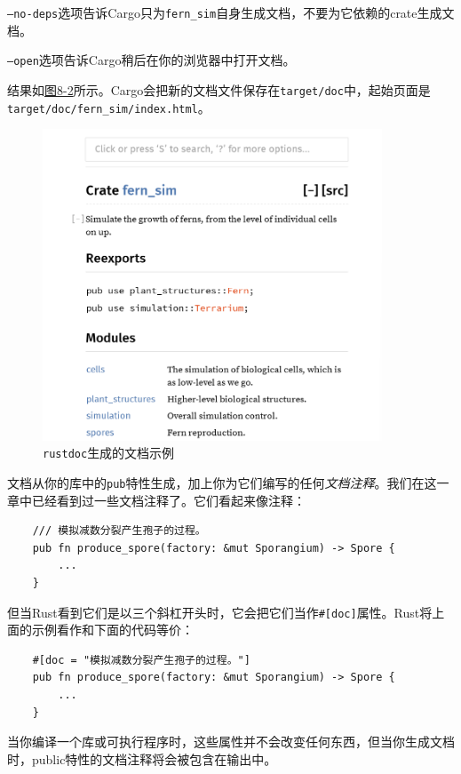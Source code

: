 \texttt{--no-deps}选项告诉Cargo只为\texttt{fern\_sim}自身生成文档，不要为它依赖的crate生成文档。

\texttt{--open}选项告诉Cargo稍后在你的浏览器中打开文档。

结果如\hyperref[f8-2]{图8-2}所示。Cargo会把新的文档文件保存在\texttt{target/doc}中，起始页面是\\
\texttt{target/doc/fern\_sim/index.html}。

\begin{figure}[htbp]
    \centering
    \includegraphics[width=0.9\textwidth]{../img/f8-2.png}
    \caption{\texttt{rustdoc}生成的文档示例}
    \label{f8-2}
\end{figure}

文档从你的库中的\texttt{pub}特性生成，加上你为它们编写的任何\emph{文档注释}。我们在这一章中已经看到过一些文档注释了。它们看起来像注释：
\begin{verbatim}
    /// 模拟减数分裂产生孢子的过程。
    pub fn produce_spore(factory: &mut Sporangium) -> Spore {
        ...
    }
\end{verbatim}
但当Rust看到它们是以三个斜杠开头时，它会把它们当作\texttt{\#[doc]}属性。Rust将上面的示例看作和下面的代码等价：
\begin{verbatim}
    #[doc = "模拟减数分裂产生孢子的过程。"]
    pub fn produce_spore(factory: &mut Sporangium) -> Spore {
        ...
    }
\end{verbatim}

当你编译一个库或可执行程序时，这些属性并不会改变任何东西，但当你生成文档时，public特性的文档注释将会被包含在输出中。

